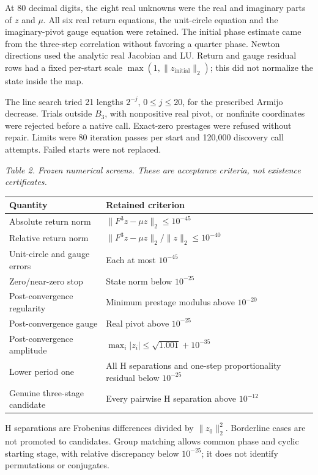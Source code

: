\documentclass[11pt,a4paper]{article}
\begin{document}
At 80 decimal digits, the eight real unknowns were the real and imaginary parts of $z$ and $\mu$. All six real return equations, the unit-circle equation and the imaginary-pivot gauge equation were retained. The initial phase estimate came from the three-step correlation without favoring a quarter phase. Newton directions used the analytic real Jacobian and LU. Return and gauge residual rows had a fixed per-start scale $\max(1,\|z_{\mathrm{initial}}\|_2)$; this did not normalize the state inside the map.

The line search tried 21 lengths $2^{-j}$, $0\leq j\leq20$, for the prescribed Armijo decrease. Trials outside $B_3$, with nonpositive real pivot, or nonfinite coordinates were rejected before a native call. Exact-zero prestages were refused without repair. Limits were 80 iteration passes per start and 120,000 discovery call attempts. Failed starts were not replaced.

\par\textit{Table 2. Frozen numerical screens. These are acceptance criteria, not existence certificates.}
\begingroup\small
\begin{tabularx}{\textwidth}{XX}
\toprule
Quantity & Retained criterion\\\midrule
Absolute return norm & $\|F^3z-\mu z\|_2\leq10^{-45}$\\
Relative return norm & $\|F^3z-\mu z\|_2/\|z\|_2\leq10^{-40}$\\
Unit-circle and gauge errors & Each at most $10^{-45}$\\
Zero/near-zero stop & State norm below $10^{-25}$\\
Post-convergence regularity & Minimum prestage modulus above $10^{-20}$\\
Post-convergence gauge & Real pivot above $10^{-25}$\\
Post-convergence amplitude & $\max_i|z_i|\leq\sqrt{1.001}+10^{-35}$\\
Lower period one & All H separations and one-step proportionality residual below $10^{-25}$\\
Genuine three-stage candidate & Every pairwise H separation above $10^{-12}$\\
\bottomrule\end{tabularx}\endgroup\par
H separations are Frobenius differences divided by $\|z_0\|_2^2$. Borderline cases are not promoted to candidates. Group matching allows common phase and cyclic starting stage, with relative discrepancy below $10^{-25}$; it does not identify permutations or conjugates.
\end{document}
